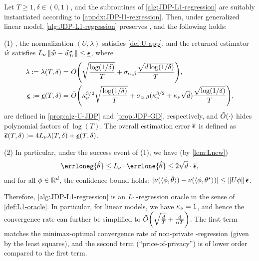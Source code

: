 \begin{theorem}\label{thm:JDP-L1-regression}
Let $T\geq 1, \delta\in(0,1)$, and the subroutines of \cref{alg:JDP-L1-regression} are suitably instantiated according to \cref{appdx:JDP-l1-regression}. Then, under generalized linear model, \cref{alg:JDP-L1-regression} preserves \aJDP, and the following holds:

(1) \Whp, the normalization $(U,\lambda)$ satisfies \eqref{def:U-app}, and the returned estimator $\widehat{w}$ satisfies $\Lipg \nrm{\hw-\hwst}\leq \lamgd$, where 
\begin{align*}
    \lambda := \lambda(T,\delta)= &~ \tbO{ \sqrt{\frac{\log(1/\delta)}{T}}+ \siga \frac{\sqrt{d\log(1/\delta)}}{T}}, \\
    \lamgd := \lamgd (T,\delta)= &~ \tbO{ \kpg^{3/2}\sqrt{\frac{\log(1/\delta)}{T}} + \siga (\kpg^{3/2}+\kpg\sqrt{d})\frac{\sqrt{\log(1/\delta)}}{T} },
\end{align*}
are defined in \cref{prop:alg-U-JDP} and \cref{prop:JDP-GD},
respectively, and 
$\tilde{O}{\left( \cdot \right)}$ hides polynomial factors of $\log(T)$. The overall estimation error $\overline{\boldsymbol{\epsilon}}$ is defined as $\lamall(T,\delta)\defeq 4\Lipg\lambda(T,\delta)+\lamgd(T,\delta)$.

(2) In particular, under the success event of (1), we have (by \cref{lem:Lnew})
\begin{align*}
    \errloneg{\hth}\leq \Lipg\cdot \errlone{\hth}\leq  2\sqrt{d} \cdot \lamall,
\end{align*}
and for all $\phi\in\mathbb{R}^d$, the confidence bound holds: $| \nu(\langle \phi, \hat{\theta}\rangle) - \nu(\langle \phi,\theta^\star \rangle) |\leq \left\|U\phi\right\| \overline{\boldsymbol{\epsilon}}$.
\end{theorem}

Therefore, \cref{alg:JDP-L1-regression} is an $L_1$-regression oracle in the sense of \cref{def:L1-oracle}.
In particular, for linear models, we have $\kappa_\nu=1$, and hence the convergence rate can further be simplified to $\tilde{O}{\left(  \sqrt{\frac{d}{T}}+\frac{d}{\alpha T}  \right)}$. The first term matches the minimax-optimal convergence rate of non-private \Lone-regression (given by the least squares), and the second term (``price-of-privacy'') is of lower order compared to the first term.


